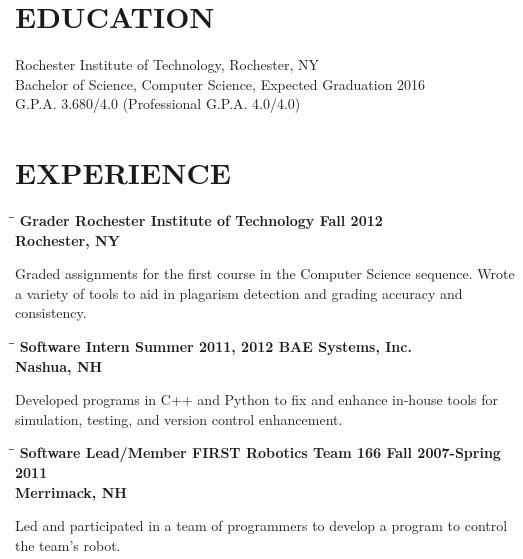 \documentclass{res}
\begin{document}
\begin{resume}

\section{EDUCATION}
    Rochester Institute of Technology, Rochester, NY  \\
    Bachelor of Science, Computer Science, Expected Graduation 2016   \\
    G.P.A. 3.680/4.0 (Professional G.P.A. 4.0/4.0)


\section{EXPERIENCE}
   \vspace{-0.1in}

   \begin{tabbing}
   \hspace{2.3in}\= \hspace{2.4in}\= \kill %
    \bf Grader
    \>Rochester Institute of Technology
    \>Fall 2012
    \\\>Rochester, NY
   \end{tabbing}\vspace{-15pt}      %
    Graded assignments for the first course in the Computer Science sequence.
    Wrote a variety of tools to aid in plagarism detection and grading accuracy and consistency.

   \begin{tabbing}
   \hspace{2.3in}\= \hspace{2.4in}\= \kill %
    \bf Software Intern
    \>Summer 2011, 2012
    \>BAE Systems, Inc.
    \\\>Nashua, NH
   \end{tabbing}\vspace{-15pt}      %
    Developed programs in C++ and Python to fix and enhance in-house tools
    for simulation, testing, and version control enhancement.

   \begin{tabbing}
   \hspace{2.3in}\= \hspace{2.4in}\= \kill %
   \bf Software Lead/Member
    \>FIRST Robotics Team 166
    \>Fall 2007-Spring 2011
    \\\>Merrimack, NH
   \end{tabbing}\vspace{-15pt}      %
    Led and participated in a team of programmers to develop a program to control
    the team's robot.


\end{resume}
\end{document}

